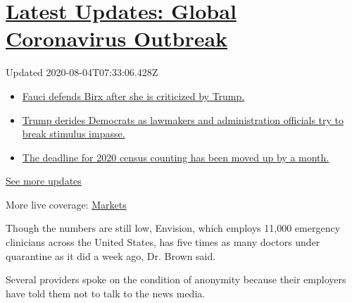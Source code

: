 \hypertarget{latest-updates-global-coronavirus-outbreak}{%
\section{\texorpdfstring{\href{https://www.nytimes3xbfgragh.onion/2020/08/03/world/coronavirus-covid-19.html?action=click\&pgtype=Article\&state=default\&region=MAIN_CONTENT_1\&context=storylines_live_updates}{Latest
Updates: Global Coronavirus
Outbreak}}{Latest Updates: Global Coronavirus Outbreak}}\label{latest-updates-global-coronavirus-outbreak}}

Updated 2020-08-04T07:33:06.428Z

\begin{itemize}
\tightlist
\item
  \href{https://www.nytimes3xbfgragh.onion/2020/08/03/world/coronavirus-covid-19.html?action=click\&pgtype=Article\&state=default\&region=MAIN_CONTENT_1\&context=storylines_live_updates\#link-4547638f}{Fauci
  defends Birx after she is criticized by Trump.}
\item
  \href{https://www.nytimes3xbfgragh.onion/2020/08/03/world/coronavirus-covid-19.html?action=click\&pgtype=Article\&state=default\&region=MAIN_CONTENT_1\&context=storylines_live_updates\#link-15e7f995}{Trump
  derides Democrats as lawmakers and administration officials try to
  break stimulus impasse.}
\item
  \href{https://www.nytimes3xbfgragh.onion/2020/08/03/world/coronavirus-covid-19.html?action=click\&pgtype=Article\&state=default\&region=MAIN_CONTENT_1\&context=storylines_live_updates\#link-e5a2cda}{The
  deadline for 2020 census counting has been moved up by a month.}
\end{itemize}

\href{https://www.nytimes3xbfgragh.onion/2020/08/03/world/coronavirus-covid-19.html?action=click\&pgtype=Article\&state=default\&region=MAIN_CONTENT_1\&context=storylines_live_updates}{See
more updates}

More live coverage:
\href{https://www.nytimes3xbfgragh.onion/live/2020/08/03/business/stock-market-today-coronavirus?action=click\&pgtype=Article\&state=default\&region=MAIN_CONTENT_1\&context=storylines_live_updates}{Markets}

Though the numbers are still low, Envision, which employs 11,000
emergency clinicians across the United States, has five times as many
doctors under quarantine as it did a week ago, Dr. Brown said.

Several providers spoke on the condition of anonymity because their
employers have told them not to talk to the news media.

